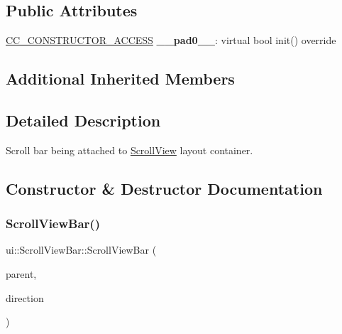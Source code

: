 \subsection*{Public Attributes}
\begin{DoxyCompactItemize}
\item 
\mbox{\label{classui_1_1ScrollViewBar_a59b55a23da36c21d4eb99193b81a32ee}} 
\hyperlink{_2cocos2d_2cocos_2base_2ccConfig_8h_a25ef1314f97c35a2ed3d029b0ead6da0}{C\+C\+\_\+\+C\+O\+N\+S\+T\+R\+U\+C\+T\+O\+R\+\_\+\+A\+C\+C\+E\+SS} {\bfseries \+\_\+\+\_\+pad0\+\_\+\+\_\+}\+: virtual bool init() override
\end{DoxyCompactItemize}
\subsection*{Additional Inherited Members}


\subsection{Detailed Description}
Scroll bar being attached to \hyperlink{classui_1_1ScrollView}{Scroll\+View} layout container. 

\subsection{Constructor \& Destructor Documentation}
\mbox{\label{classui_1_1ScrollViewBar_a3fe40127ee557a66d7dfa2eb41d9219b}} 
\subsubsection{\texorpdfstring{Scroll\+View\+Bar()}{ScrollViewBar()}\hspace{0.1cm}{\footnotesize\ttfamily [1/2]}}
{\footnotesize\ttfamily ui\+::\+Scroll\+View\+Bar\+::\+Scroll\+View\+Bar (\begin{DoxyParamCaption}\item[{\hyperlink{classui_1_1ScrollView}{Scroll\+View} $\ast$}]{parent,  }\item[{\hyperlink{classui_1_1ScrollView_aed2d778ae8098dcafe323b2beae8dd6b}{Scroll\+View\+::\+Direction}}]{direction }\end{DoxyParamCaption})}

